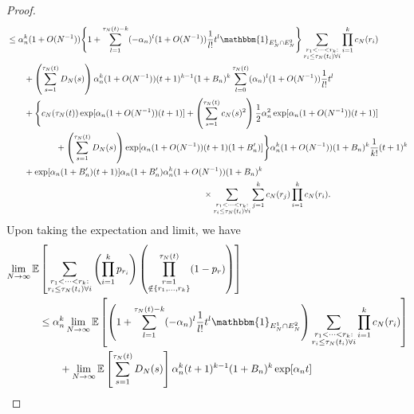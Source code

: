 \documentclass{article}
\newcommand{\E}{\mathbb{E}}
\newcommand{\1}[1]{\mathbbm{1}_{#1}}
\begin{document}
\begin{proof}
\begin{align}
&\leq \alpha_n^k (1+O(N^{-1})) \Bigg\{
        1+ \sum_{l=1}^{\tau_N(t) -k} (-\alpha_n)^l (1+O(N^{-1})) \frac{1}{l!} t^l
        \1{E_N^1 \cap E_N^2} \Bigg\}
        \sum_{\substack{r_1 <\dots< r_k :\\ r_i \leq \tau_N(t_i) \forall i}}
        \prod_{i=1}^k c_N(r_i) \notag\\
    &\qquad+ \left( \sum_{s=1}^{\tau_N(t)} D_N(s) \right)
        \alpha_n^k (1+O(N^{-1})) (t+1)^{k-1} (1+B_n)^k
        \sum_{l=0}^{\tau_N(t)} (\alpha_n)^l (1+O(N^{-1})) \frac{1}{l!} t^l 
        \notag\\
    &\qquad+ \Bigg\{ c_N(\tau_N(t)) 
        \exp[ \alpha_n (1+O(N^{-1})) (t+1) ]
        + \left( \sum_{s=1}^{\tau_N(t)} c_N(s)^2 \right)
        \frac{1}{2} \alpha_n^2 \exp[ \alpha_n (1+O(N^{-1})) (t+1) ] \notag\\
    &\hspace{2cm}+ \left( \sum_{s=1}^{\tau_N(t)} D_N(s) \right)
        \exp[ \alpha_n (1+O(N^{-1})) (t+1) (1+B_n^\prime) ] \Bigg\}
        \alpha_n^k (1+O(N^{-1})) (1 + B_n)^k \frac{1}{k!} (t+1)^k \notag\\
    &\qquad+ \exp[ \alpha_n (1 + B_n^\prime) (t+1) ]
        \alpha_n (1 + B_n^\prime)
        \alpha_n^k (1+O(N^{-1})) (1 + B_n)^k \notag\\
    &\hspace{8cm}\times \sum_{\substack{r_1 <\dots< r_k 
        :\\ r_i \leq \tau_N(t_i) \forall i}}
        \sum_{j=1}^k c_N(r_j)
        \prod_{i=1}^k c_N(r_i).
\end{align}
Upon taking the expectation and limit, we have
\begin{align}
\lim_{N\to\infty} \E &\left[ 
        \sum_{\substack{r_1 <\dots< r_k :\\ r_i \leq \tau_N(t_i) \forall i}}
        \left( \prod_{i=1}^k p_{r_i} \right)
        \left( \prod_{\substack{r=1 \\ \notin \{r_1,\dots,r_k\} }}^{\tau_N(t)} 
        (1-p_r) \right) \right] \notag\\
&\leq \alpha_n^k \lim_{N\to\infty} \E\left[ \left( 1+
        \sum_{l=1}^{\tau_N(t) -k} (-\alpha_n)^l \frac{1}{l!} t^l 
        \1{E_N^1 \cap E_N^2} \right)
        \sum_{\substack{r_1 <\dots< r_k :\\ r_i \leq \tau_N(t_i) \forall i}}
        \prod_{i=1}^k c_N(r_i) \right] \notag\\
    &\qquad+  \lim_{N\to\infty} \E\left[ \sum_{s=1}^{\tau_N(t)} D_N(s) \right]
        \alpha_n^k (t+1)^{k-1} (1+B_n)^k
        \exp[ \alpha_n t ] \notag\\

\end{align}
\end{proof}
\end{document}
